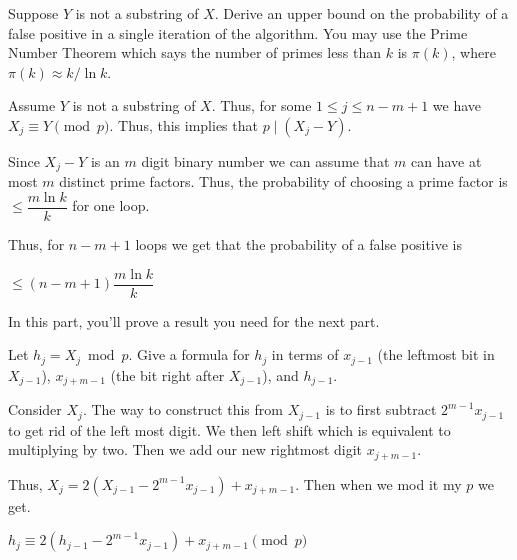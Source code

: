 \documentclass[12pt, letterpaper]{article}
\begin{document}
\begin{subproblem}{}
    Suppose $Y$ is not a substring of $X$. Derive an upper bound on the probability of a false positive in a single iteration of the algorithm. You may use the Prime Number Theorem which says the number of primes less than $k$ is $\pi(k)$, where $\pi(k) \approx k/ \ln k$. 
\end{subproblem}
\begin{problemproof}
    Assume $Y$ is not a substring of $X$. Thus, for some $1 \leq j \leq n-m+1$ we have $X_j \equiv Y \pmod{p}$. Thus, this implies that $p \mid (X_j-Y)$.

    Since $X_j-Y$ is an $m$ digit binary number we can assume that $m$ can have at most $m$ distinct prime factors. Thus, the probability of choosing a prime factor is $\leq \dfrac{m \ln k}{k}$ for one loop.

    Thus, for $n-m+1$ loops we get that the probability of a false positive is 
    
    $\leq (n-m+1) \dfrac{m \ln k}{k}$
\end{problemproof}

\begin{subproblem}{}
    In this part, you'll prove a result you need for the next part.
        
        Let $h_{j} = X_{j} \bmod p$. Give a formula for $h_j$ in terms of $x_{j-1}$ (the leftmost bit in $X_{j-1}$), $x_{j+m-1}$ (the bit right after $X_{j-1}$), and $h_{j-1}$.
\end{subproblem}
\begin{problemproof}
    Consider $X_j$. The way to construct this from $X_{j-1}$ is to first subtract $2^{m-1} x_{j-1}$ to get rid of the left most digit. We then left shift which is equivalent to multiplying by two. Then we add our new rightmost digit $x_{j+m-1}$.

    Thus, $X_j=2(X_{j-1}-2^{m-1}x_{j-1})+x_{j+m-1}$. Then when we mod it my $p$ we get.

    $h_j \equiv 2(h_{j-1}-2^{m-1}x_{j-1})+x_{j+m-1} \pmod{p}$
\end{problemproof}
\end{document}

